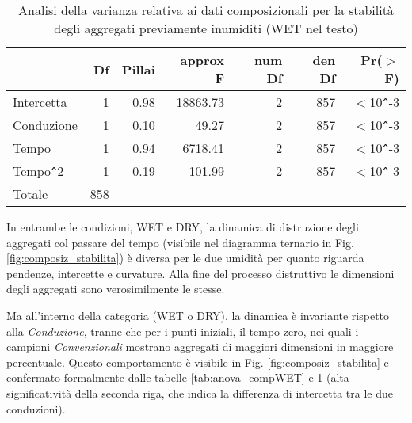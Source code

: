 \documentclass[a4paper]{article}
\begin{document}
\begin{table}[ht]
\centering
\caption{Analisi della varianza relativa ai dati composizionali per la
  stabilità degli aggregati previamente inumiditi (WET nel testo)}
\label{tab:anova_compDRY}
\begin{tabular}{lrrrrrr}
  \hline
 & Df & Pillai & approx F & num Df & den Df & Pr($>$F) \\ 
  \hline
Intercetta & 1 & 0.98 & 18863.73 & 2 & 857 & $<$10\verb|^|-3 \\ 
  Conduzione & 1 & 0.10 & 49.27 & 2 & 857 & $<$10\verb|^|-3 \\ 
  Tempo & 1 & 0.94 & 6718.41 & 2 & 857 & $<$10\verb|^|-3 \\ 
  Tempo\verb|^|2 & 1 & 0.19 & 101.99 & 2 & 857 & $<$10\verb|^|-3 \\ 
  Totale & 858 &  &  &  &  &  \\ 
   \hline
\end{tabular}
\end{table}


In entrambe le condizioni, WET e DRY, la dinamica di distruzione degli
aggregati col passare del tempo (visibile nel diagramma ternario in
Fig. \ref{fig:composiz_stabilita}) è diversa per le due umidità per
quanto riguarda pendenze, intercette e curvature. Alla fine del
processo distruttivo le dimensioni degli aggregati sono verosimilmente
le stesse.

Ma all'interno della categoria (WET o DRY), la dinamica è invariante
rispetto alla \emph{Conduzione}, tranne che per i punti iniziali, il
tempo zero, nei quali i campioni \emph{Convenzionali} mostrano
aggregati di maggiori dimensioni in maggiore percentuale. Questo
comportamento è visibile in Fig. \ref{fig:composiz_stabilita} e
confermato formalmente dalle tabelle \ref{tab:anova_compWET}
e \ref{tab:anova_compDRY} (alta significatività della seconda riga,
che indica la differenza di intercetta tra le due conduzioni).
\end{document}

